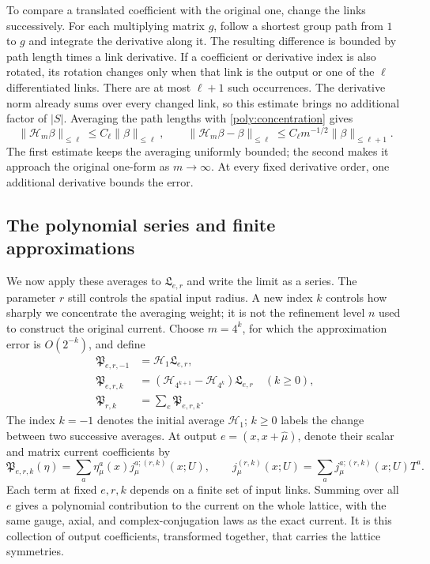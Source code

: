 \documentclass[11pt,a4paper]{article}
\theoremstyle{remark}
\begin{document}
To compare a translated coefficient with the original one, change the
links successively. For each multiplying matrix $g$, follow a shortest
group path from $1$ to $g$ and integrate the derivative along it.
The resulting difference is bounded by path length times a link
derivative. If a coefficient or derivative index is also rotated, its
rotation changes only when that link is the output or one of the
$\ell$ differentiated links. There are at most $\ell+1$ such
occurrences. The derivative norm already sums over every changed link,
so this estimate brings no additional factor of $|S|$.
Averaging the path lengths with \eqref{poly:concentration} gives
\begin{equation}
 \|\mathcal H_m\beta\|_{\leq\ell}
       \leq C_\ell\|\beta\|_{\leq\ell},
 \qquad
 \|\mathcal H_m\beta-\beta\|_{\leq\ell}
       \leq C_\ell m^{-1/2}\|\beta\|_{\leq\ell+1}.
 \label{poly:approximation}
\end{equation}
The first estimate keeps the averaging uniformly bounded; the second
makes it approach the original one-form as $m\to\infty$. At every
fixed derivative order, one additional derivative bounds the error.

\subsection{The polynomial series and finite approximations}

We now apply these averages to $\mathfrak L_{e,r}$ and write the
limit as a series. The parameter $r$ still controls the spatial input
radius. A new index $k$ controls how sharply we concentrate the
averaging weight; it is not the refinement level $n$ used to construct
the original current. Choose $m=4^k$, for which the approximation
error is $O(2^{-k})$, and define
\begin{equation}
 \begin{split}
 \mathfrak P_{e,r,-1}&=\mathcal H_1\mathfrak L_{e,r},\\
 \mathfrak P_{e,r,k}&=(\mathcal H_{4^{k+1}}-\mathcal H_{4^k})
                         \mathfrak L_{e,r}\quad(k\geq0),\\
 \mathfrak P_{r,k}&=\sum_e\mathfrak P_{e,r,k}.
 \end{split}
 \label{poly:blocks}
\end{equation}
The index $k=-1$ denotes the initial average $\mathcal H_1$;
$k\ge0$ labels the change between two successive averages. At output
$e=(x,x+\hat\mu)$, denote their scalar and matrix current
coefficients by
\begin{equation}
 \mathfrak P_{e,r,k}(\eta)
   =\sum_a\eta_\mu^a(x)j_\mu^{a;(r,k)}(x;U),\qquad
 j_\mu^{(r,k)}(x;U)=\sum_a j_\mu^{a;(r,k)}(x;U)T^a .
\end{equation}
Each term at fixed $e,r,k$ depends on a finite set of input links.
Summing over all $e$ gives a polynomial contribution to the current
on the whole lattice, with the same gauge, axial, and
complex-conjugation laws as the exact current. It is this collection
of output coefficients, transformed together, that carries the lattice
symmetries.
\end{document}
